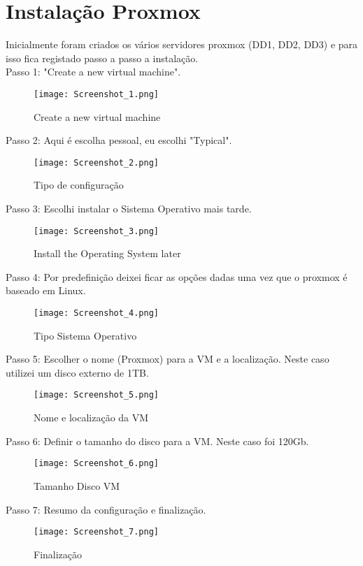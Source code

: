 \section{Instalação Proxmox}

Inicialmente foram criados os vários servidores proxmox (DD1, DD2, DD3) e para isso fica registado passo a passo a instalação.\\

Passo 1: "Create a new virtual machine".
\begin{figure}[H]
\center
\texttt{[image: Screenshot\_1.png]}
\caption{Create a new virtual machine}
\end{figure}

\newpage
Passo 2: Aqui é escolha pessoal, eu escolhi "Typical".
\begin{figure}[H]
\center
\texttt{[image: Screenshot\_2.png]}
\caption{Tipo de configuração}
\end{figure}

Passo 3: Escolhi instalar o Sistema Operativo mais tarde.
\begin{figure}[H]
\center
\texttt{[image: Screenshot\_3.png]}
\caption{Install the Operating System later}
\end{figure}

\newpage
Passo 4: Por predefinição deixei ficar as opções dadas uma vez que o proxmox é baseado em Linux.
\begin{figure}[H]
\center
\texttt{[image: Screenshot\_4.png]}
\caption{Tipo Sistema Operativo}
\end{figure}

Passo 5: Escolher o nome (Proxmox) para a \ac{VM} e a localização. Neste caso utilizei um disco externo de 1TB.
\begin{figure}[H]
\center
\texttt{[image: Screenshot\_5.png]}
\caption{Nome e localização da \ac{VM}}
\end{figure}

\newpage
Passo 6: Definir o tamanho do disco para a \ac{VM}. Neste caso foi 120Gb.
\begin{figure}[H]
\center
\texttt{[image: Screenshot\_6.png]}
\caption{Tamanho Disco \ac{VM}}
\end{figure}

Passo 7: Resumo da configuração e finalização.
\begin{figure}[H]
\center
\texttt{[image: Screenshot\_7.png]}
\caption{Finalização}
\end{figure}

